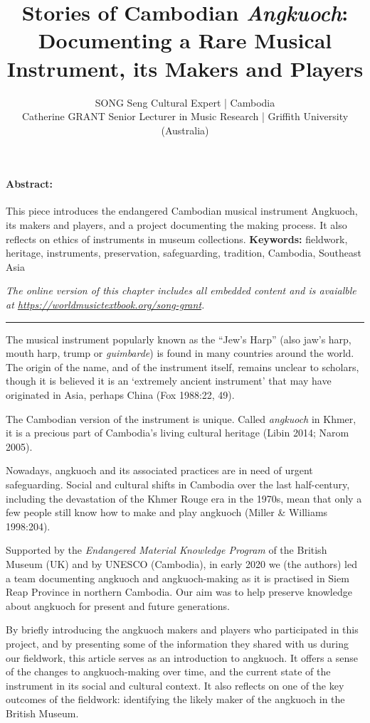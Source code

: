 \documentclass[twoside]{article}
\title{Stories of Cambodian \emph{Angkuoch}: Documenting a Rare Musical Instrument, its Makers and Players}
\author{SONG Seng Cultural Expert | Cambodia\\Catherine GRANT Senior Lecturer in Music Research | Griffith University (Australia)}
\date{}
\makeatletter
\renewcommand{\maketitle}{\bgroup\setlength{\parindent}{0pt}
\begin{flushleft}
  \vspace*{3\baselineskip}
  \huge{\textbf{\@title}}

  \medskip
  
  \large{\@author}
\end{flushleft}\egroup
}
\providecommand{\keywords}[1]
{
  \newline
  \textbf{Keywords:} #1
}
\providecommand{\wmturl}{\href{https://worldmusictextbook.org/song-grant}{https://worldmusictextbook.org/song-grant}}
\providecommand{\wmturltext}{
  \noindent\emph{The online version of this chapter includes all embedded content and is avaialble at \wmturl.}
}
\makeatother
\begin{document}
\suppressfloats %
\maketitle

\paragraph{Abstract:}
This piece introduces the endangered Cambodian musical instrument Angkuoch, its makers and players, and a project documenting the making process. It also reflects on ethics of instruments in museum collections.\keywords{fieldwork, heritage, instruments, preservation, safeguarding, tradition, Cambodia, Southeast Asia}

\smallskip

\wmturltext

\medskip

\noindent\hfil\rule{0.5\textwidth}{0.4pt}\hfil

\bigskip

The musical instrument popularly known as the ``Jew's Harp'' (also jaw's
harp, mouth harp, trump or \emph{guimbarde}) is found in many countries
around the world. The origin of the name, and of the instrument itself,
remains unclear to scholars, though it is believed it is an `extremely
ancient instrument' that may have originated in Asia, perhaps China (Fox
1988:22, 49).

The Cambodian version of the instrument is unique. Called
\emph{angkuoch} in Khmer, it is a precious part of Cambodia's living
cultural heritage (Libin 2014; Narom 2005).

Nowadays, angkuoch and its associated practices are in need of urgent
safeguarding. Social and cultural shifts in Cambodia over the last
half-century, including the devastation of the Khmer Rouge era in the
1970s, mean that only a few people still know how to make and play
angkuoch (Miller \& Williams 1998:204).

Supported by the \emph{Endangered Material Knowledge Program} of the
British Museum (UK) and by UNESCO (Cambodia), in early 2020 we (the
authors) led a team documenting angkuoch and angkuoch-making as it is
practised in Siem Reap Province in northern Cambodia. Our aim was to
help preserve knowledge about angkuoch for present and future
generations.

By briefly introducing the angkuoch makers and players who participated
in this project, and by presenting some of the information they shared
with us during our fieldwork, this article serves as an introduction to
angkuoch. It offers a sense of the changes to angkuoch-making over time,
and the current state of the instrument in its social and cultural
context. It also reflects on one of the key outcomes of the fieldwork:
identifying the likely maker of the angkuoch in the British Museum.
\end{document}
